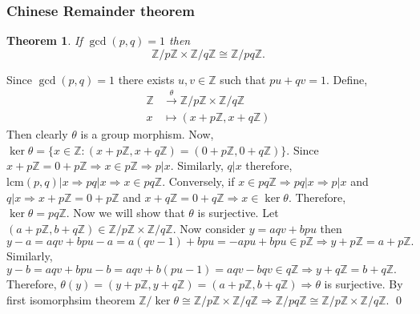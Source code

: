 \documentclass[11pt]{amsart}
\newtheorem{theorem}{Theorem}[section]
\newcommand{\ZZ}{\mathbb Z}
\newcommand{\lcm}[1]{\text{lcm}(#1)}
\begin{document}
\subsubsection{Chinese Remainder theorem}
\begin{theorem}
If $\gcd(p,q)=1$ then $${\ZZ}/p{\ZZ}\times {\ZZ}/q{\ZZ}\cong {\ZZ}/pq{\ZZ}.$$
\end{theorem}
\proof Since $\gcd(p,q)=1$ there exists $u,v\in {\ZZ}$ such that $pu+qv=1.$ Define, \begin{align*}
{\ZZ}&\stackrel{\theta}{\longrightarrow} {\ZZ}/p{\ZZ}\times {\ZZ}/q{\ZZ}\\
x&\mapsto (x+p{\ZZ},x+q{\ZZ})
\end{align*}
Then clearly $\theta$ is a group morphism. Now, $\ker\theta=\{x\in {\ZZ}:(x+p{\ZZ},x+q{\ZZ})=(0+p{\ZZ},0+q{\ZZ})\}.$ Since $x+p{\ZZ}=0+p{\ZZ}\Rightarrow x\in p{\ZZ} \Rightarrow p\big|x.$ Similarly, $q\big| x$ therefore, $\lcm {p,q}\big|x \Rightarrow pq\big| x \Rightarrow x\in pq{\ZZ}.$ Conversely, if $x\in pq{\ZZ} \Rightarrow pq\big|x \Rightarrow p|x$ and $q|x \Rightarrow x+p{\ZZ}=0+p{\ZZ}$ and $x+q{\ZZ}=0+q{\ZZ} \Rightarrow x\in \ker\theta.$ Therefore, $\ker\theta=pq{\ZZ}.$ Now we will show that $\theta$ is surjective. Let $(a+p{\ZZ},b+q{\ZZ})\in {\ZZ}/p{\ZZ}\times {\ZZ}/q{\ZZ}.$ Now consider $y=aqv+bpu$ then $y-a=aqv+bpu-a=a(qv-1)+bpu=-apu+bpu\in p{\ZZ} \Rightarrow y+ p{\ZZ}=a+p{\ZZ}.$ Similarly, $y-b=aqv+bpu-b=aqv+b(pu-1)=aqv-bqv\in q{\ZZ} \Rightarrow y+q{\ZZ}=b+q{\ZZ}.$ Therefore, $\theta(y)=(y+p{\ZZ},y+q{\ZZ})=(a+p{\ZZ},b+q{\ZZ}) \Rightarrow \theta$ is surjective. By first isomorphsim theorem ${\ZZ}/\ker\theta\cong {\ZZ}/p{\ZZ}\times {\ZZ}/q{\ZZ} \Rightarrow {\ZZ}/pq{\ZZ}\cong {\ZZ}/p{\ZZ}\times {\ZZ}/q{\ZZ}.$ \qed
\end{document}
